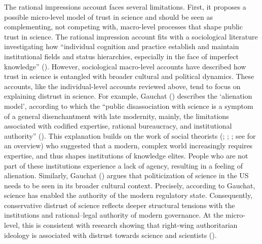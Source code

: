 \documentclass[
  jou,
  floatsintext,
  longtable,
  nolmodern,
  notxfonts,
  notimes,
  colorlinks=true,linkcolor=blue,citecolor=blue,urlcolor=blue]{apa7}
\begin{document}
The rational impressions account faces several limitations. First, it
proposes a possible micro-level model of trust in science and should be
seen as complementing, not competing with, macro-level processes that
shape public trust in science. The rational impression account fits with
a sociological literature investigating how ``individual cognition and
practice establish and maintain institutional fields and status
hierarchies, especially in the face of imperfect knowledge''
(). However, sociological macro-level accounts have
described how trust in science is entangled with broader cultural and
political dynamics. These accounts, like the individual-level accounts
reviewed above, tend to focus on explaining distrust in science. For
example, Gauchat
() describes the
`alienation model', according to which the ``public disassociation with
science is a symptom of a general disenchantment with late modernity,
mainly, the limitations associated with codified expertise, rational
bureaucracy, and institutional authority''
(). This explanation builds on the work of social theorists
(;
;
; see
 for an
overview) who suggested that a modern, complex world increasingly
requires expertise, and thus shapes institutions of knowledge elites.
People who are not part of these institutions experience a lack of
agency, resulting in a feeling of alienation. Similarly, Gauchat
() argues that
politicization of science in the US needs to be seen in its broader
cultural context. Precisely, according to Gauchat, science has enabled
the authority of the modern regulatory state. Consequently, conservative
distrust of science reflects deeper structural tensions with the
institutions and rational--legal authority of modern governance. At the
micro-level, this is consistent with research showing that right-wing
authoritarian ideology is associated with distrust towards science and
scientists ().
\end{document}
